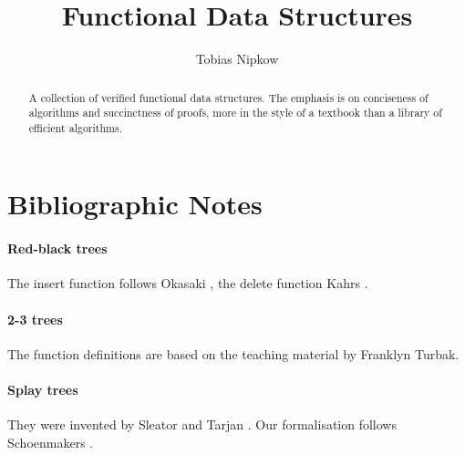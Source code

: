 \documentclass[11pt,a4paper]{article}
\begin{document}
\title{Functional Data Structures}
\author{Tobias Nipkow}
\maketitle

\begin{abstract}
A collection of verified functional data structures. The emphasis is on
conciseness of algorithms and succinctness of proofs, more in the style
of a textbook than a library of efficient algorithms.
\end{abstract}

\setcounter{tocdepth}{1}
\tableofcontents
\newpage



\section{Bibliographic Notes}

\paragraph{Red-black trees}
The insert function follows Okasaki \cite{Okasaki}, the delete function
Kahrs \cite{Kahrs-html,Kahrs-JFP01}.

\paragraph{2-3 trees}
The function definitions are based on the teaching material by Franklyn Turbak.

\paragraph{Splay trees}
They were invented by Sleator and Tarjan \cite{SleatorT-JACM85}.
Our formalisation follows Schoenmakers \cite{Schoenmakers-IPL93}.



\end{document}
